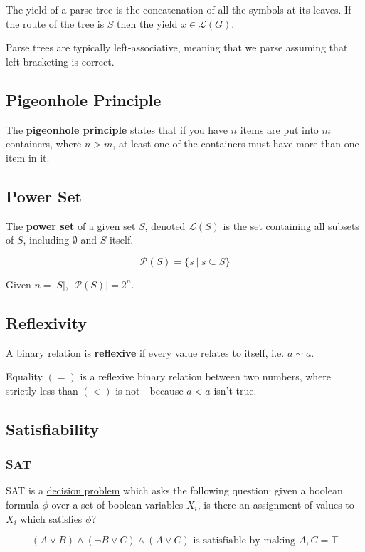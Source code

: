\documentclass{article}
\begin{document}
The yield of a parse tree is the concatenation of all the symbols at its leaves. If the route of the tree is $S$ then the yield $x \in \mathcal{L}(G)$.

Parse trees are typically left-associative, meaning that we parse assuming that left bracketing is correct.


\subsection{Pigeonhole Principle}\label{pigeonhole-principle}
The \textbf{pigeonhole principle} states that if you have $n$ items are put into $m$ containers, where $n > m$, at least one of the containers must have more than one item in it.


\subsection{Power Set}\label{power-set}
The \textbf{power set} of a given set $S$, denoted $\mathcal{L}(S)$ is the set containing all subsets of $S$, including $\emptyset$ and $S$ itself.

\[\mathcal{P}(S) = \{s \:|\: s \subseteq S\}\]

Given $n=|S|$, $|\mathcal{P}(S)|=2^n$.


\subsection{Reflexivity}\label{reflexive}
A binary relation is \textbf{reflexive} if every value relates to itself, i.e. $a \sim a$.

Equality $(=)$ is a reflexive binary relation between two numbers, where strictly less than $(<)$ is not - because $a < a$ isn't true.


\subsection{Satisfiability}
\subsubsection{SAT}\label{sat}
SAT is a \hyperref[decision-problem]{decision problem} which asks the following question: given a boolean formula $\phi$ over a set of boolean variables $X_i$, is there an assignment of values to $X_i$ which satisfies $\phi$?

\[(A \vee B) \wedge (\neg B \vee C) \wedge (A \vee C)\text{ is satisfiable by making $A, C = \top$}\]
\end{document}
